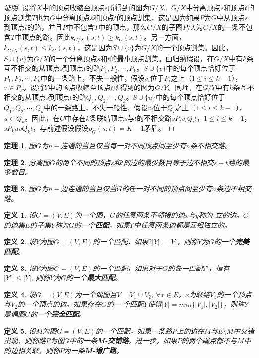 \documentclass{article}
\newtheorem{Def}{定义}
\newtheorem{Thm}{定理}
\begin{document}
\begin{CJK*}{UTF8}{gbsn}
\begin{proof}[证明]
    设将$X$中的顶点收缩至顶点$s$所得到的图为$G/X$。$G/X$中分离顶点$s$和顶点$t$的顶点割集$T$也为$G$中分离顶点$s$和顶点$t$的顶点割集，这是因为如果$P$为$G$中从顶点$s$到顶点$t$的路，并且$P$中不包含$T$中的顶点，那么$G/X$的子图$P/X$为$G/X$的一条不包含$T$中顶点的路。因此$k_{G/X}(s,t)\geq k_{G}(s,t)$。另一方面，$k_{G/X}(s,t)\leq k_{G}(s,t)$，这是因为$S\cup \{v\}$为$G/X$的一个顶点割集。因此，$S\cup \{u\}$为$G/X$的一个分离顶点$s$和$t$的最小顶点割集。由归纳假设，在$G/X$中有$k$条互不相交的从顶点$s$到顶点$t$的路$P_1,P_2,\cdots,P_k$。$S\cup \{v\}$中的每个顶点恰好位于$P_1,P_2,\cdots,P_k$中的一条路上，不失一般性，假设$v_i$位于$P_i$之上（$1\leq i \leq k-1$），$v\in P_k$。设将$Y$中的顶点收缩至顶点$t$所得到的图为$G/Y$。同理，在$G/Y$中有$k$条互不相交的从顶点$s$到顶点$t$的路$Q_1, Q_2, \cdots, Q_k$。$S\cup \{u\}$中的每个顶点恰好位于$Q_1,Q_2,\cdots,Q_k$中的一条路上，不失一般性，假设$v_i$位于$Q_i$之上（$1\leq i \leq k-1$），$u\in Q_k$。因此，在$G$中存在$k$条联结顶点$s$与$t$的不相交路$sP_iv_iQ_it$，$1\leq i \leq k-1$，$sP_kuvQ_kt$，与前述假设假设$p_G(s,t) = K - 1$矛盾。
  \end{proof}
  \begin{Thm}
    图$G$为$n-$连通的当且仅当每一对不同顶点间至少有$n$条不相交路。
  \end{Thm}
  \begin{Thm}
    分离图$G$的两个不同的顶点$s$和$t$的边的最少数目等于边不相交$s-t$路的最多数目。
  \end{Thm}
  \begin{Thm}
    图$G$为$n-$边连通的当且仅当$G$的任一对不同的顶点间至少有$n$条边不相交路。
  \end{Thm}
    \begin{Def}
    设$G=(V,E)$为一个图，$G$的任意两条不邻接的边$x$与$y$称为{
      立}的边。$G$的边集$E$的子集$Y$称为$G$的一个{\bfseries 匹配}，如果$Y$中任意两条边都是互相独立的。
  \end{Def}

    \begin{Def}
    设$Y$为图$G=(V,E)$的一个匹配，如果$2|Y|=|V|$，则称$Y$为$G$的一个{\bfseries 完美匹配}。
  \end{Def}

      \begin{Def}
   设$Y$为图$G=(V,E)$的一个匹配，如果对于$G$的任一匹配$Y'$，恒有$|Y'|\leq |Y|$, 则称$Y$为$G$的一个{\bfseries 最大匹配}。
  \end{Def}

    \begin{Def}
    设$G=(V,E)$为一个偶图且$V=V_1\cup V_2$,
    $\forall x \in
    E$，$x$为联结$V_1$的一个顶点与$V_2$的一个顶点的边。如果存在$G$的一
    个匹配$Y$使得$|Y|=min\{|V_1|,|V_2|\}$，则称$Y$是偶图$G$的一个{\bfseries 完全匹配}。
  \end{Def}
  \begin{Def}
  设$M$为图$G=(V,E)$的一个匹配，如果一条路$P$上的边在$M$与$E\setminus M$中交错出现，则称路$P$为图$G$中的一条{\bfseries M-交错路}。进一步，如果$P$的两个端点都不与$M$中的边相关联，则称$P$为一条{\bfseries M-增广路}。
  \end{Def}



\end{CJK*}
\end{document}
